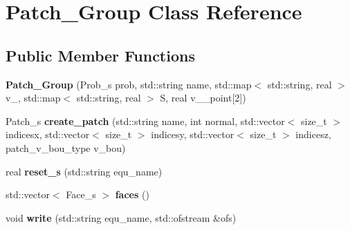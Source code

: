 \hypertarget{classPatch__Group}{
\section{Patch\_\-Group Class Reference}
\label{classPatch__Group}
}
\subsection*{Public Member Functions}
\begin{DoxyCompactItemize}
\item 
\hypertarget{classPatch__Group_aca3d4f7109706b6db9b0c928649c87a4}{
{\bfseries Patch\_\-Group} (Prob\_\-s prob, std::string name, std::map$<$ std::string, real $>$ v\_, std::map$<$ std::string, real $>$ S, real v\_\_\-point\mbox{[}2\mbox{]})}
\label{classPatch__Group_aca3d4f7109706b6db9b0c928649c87a4}

\item 
\hypertarget{classPatch__Group_abb0f6e18c5833efbe20634c1e4aabe9b}{
Patch\_\-s {\bfseries create\_\-patch} (std::string name, int normal, std::vector$<$ size\_\-t $>$ indicesx, std::vector$<$ size\_\-t $>$ indicesy, std::vector$<$ size\_\-t $>$ indicesz, patch\_\-v\_\-bou\_\-type v\_\-bou)}
\label{classPatch__Group_abb0f6e18c5833efbe20634c1e4aabe9b}

\item 
\hypertarget{classPatch__Group_ada9f56e3be9279ff5d555f2192cfc45b}{
real {\bfseries reset\_\-s} (std::string equ\_\-name)}
\label{classPatch__Group_ada9f56e3be9279ff5d555f2192cfc45b}

\item 
\hypertarget{classPatch__Group_a326628f83583bb2194f8c82548e9b6b3}{
std::vector$<$ Face\_\-s $>$ {\bfseries faces} ()}
\label{classPatch__Group_a326628f83583bb2194f8c82548e9b6b3}

\item 
\hypertarget{classPatch__Group_a3de7d3df9923795d4cbfa4d908e53598}{
void {\bfseries write} (std::string equ\_\-name, std::ofstream \&ofs)}
\label{classPatch__Group_a3de7d3df9923795d4cbfa4d908e53598}

\end{DoxyCompactItemize}
